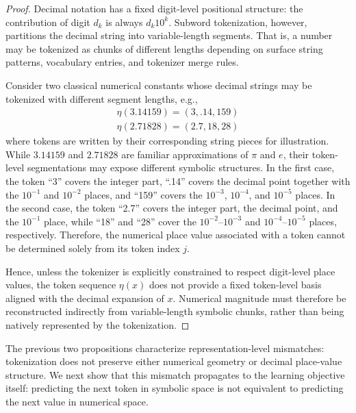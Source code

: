 \begin{proof}
Decimal notation has a fixed digit-level positional structure: the contribution
of digit $d_k$ is always $d_k10^k$. Subword tokenization, however, partitions the
decimal string into variable-length segments. That is, a number may be tokenized
as chunks of different lengths depending on surface string patterns, vocabulary
entries, and tokenizer merge rules.

Consider two classical numerical constants whose decimal strings may be tokenized
with different segment lengths, e.g.,
\begin{equation}
\begin{split}
    \eta(3.14159) = (3, .14, 159) \\
    \eta(2.71828) = (2.7, 18, 28)
\end{split}
\end{equation}
where tokens are written by their corresponding string pieces for illustration.
While $3.14159$ and $2.71828$ are familiar approximations of $\pi$ and $e$,
their token-level segmentations may expose different symbolic structures. In the
first case, the token ``3'' covers the integer part, ``.14'' covers the decimal
point together with the $10^{-1}$ and $10^{-2}$ places, and ``159'' covers the
$10^{-3}$, $10^{-4}$, and $10^{-5}$ places. In the second case, the token ``2.7''
covers the integer part, the decimal point, and the $10^{-1}$ place, while
``18'' and ``28'' cover the $10^{-2}$--$10^{-3}$ and $10^{-4}$--$10^{-5}$ places,
respectively. Therefore, the numerical place value associated with a token cannot
be determined solely from its token index $j$.

Hence, unless the tokenizer is explicitly constrained to respect digit-level
place values, the token sequence $\eta(x)$ does not provide a fixed token-level
basis aligned with the decimal expansion of $x$. Numerical magnitude must
therefore be reconstructed indirectly from variable-length symbolic chunks,
rather than being natively represented by the tokenization.
\end{proof}



The previous two propositions characterize representation-level mismatches: tokenization does not preserve either numerical geometry or decimal place-value structure. We next show that this mismatch propagates to the learning objective itself: predicting the next token in symbolic space is not equivalent to predicting the next value in numerical space.



